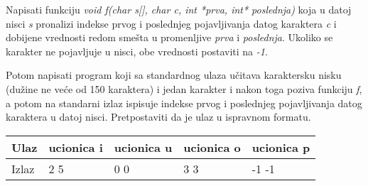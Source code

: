 \begin{Exercise}[label=v1.3_01] 
Napisati funkciju \emph{void f(char s[], char c, int *prva, int*
  poslednja)} koja u datoj nisci {\em s} pronalizi indekse prvog i
  poslednjeg pojavljivanja datog karaktera {\em c} i dobijene
  vrednosti redom sme\v sta u promenljive {\em prva} i {\em
    poslednja}. Ukoliko se karakter ne pojavljuje u nisci, obe
  vrednosti postaviti na {\em -1}. 

  Potom napisati program koji sa standardnog ulaza u\v citava
  karaktersku nisku (du\v zine ne ve\' ce od 150 karaktera) i jedan
  karakter i nakon toga poziva funkciju {\em f}, a potom na standarni
  izlaz ispisuje indekse prvog i poslednjeg pojavljivanja datog
  karaktera u datoj nisci. Pretpostaviti da je ulaz u ispravnom
  formatu.

\small
\begin{tabular}{ |l|l|l|l|l| }
\hline 
  Ulaz & ucionica i  & ucionica u & ucionica o & ucionica p \\ \hline 
  Izlaz & 2 5 & 0 0 & 3 3 & -1 -1 \\ \hline 
\end{tabular}
\normalsize
{}
\end{Exercise}
\begin{Answer}[ref=v1.3_01]
\end{Answer}

